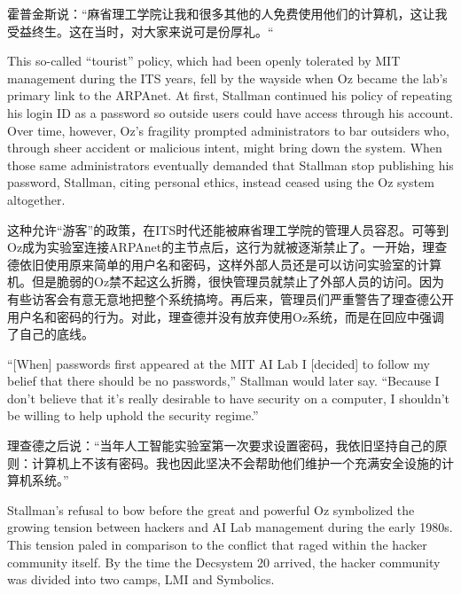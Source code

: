 \ifdefined\chs
霍普金斯说：“麻省理工学院让我和很多其他的人免费使用他们的计算机，这让我受益终生。这在当时，对大家来说可是份厚礼。“
\fi

\ifdefined\eng
This so-called ``tourist'' policy, which had been openly tolerated by MIT management during the ITS years, fell by the wayside when Oz became the lab's primary link to the ARPAnet. At first, Stallman continued his policy of repeating his login ID as a password so outside users could have access through his account. Over time, however, Oz's fragility prompted administrators to bar outsiders who, through sheer accident or malicious intent, might bring down the system. When those same administrators eventually demanded that Stallman stop publishing his password, Stallman, citing personal ethics, instead ceased using the Oz system altogether.
\fi

\ifdefined\chs
这种允许“游客”的政策，在ITS时代还能被麻省理工学院的管理人员容忍。可等到Oz成为实验室连接ARPAnet的主节点后，这行为就被逐渐禁止了。一开始，理查德依旧使用原来简单的用户名和密码，这样外部人员还是可以访问实验室的计算机。但是脆弱的Oz禁不起这么折腾，很快管理员就禁止了外部人员的访问。因为有些访客会有意无意地把整个系统搞垮。再后来，管理员们严重警告了理查德公开用户名和密码的行为。对此，理查德并没有放弃使用Oz系统，而是在回应中强调了自己的底线。
\fi

\ifdefined\eng
``[When] passwords first appeared at the MIT AI Lab I [decided] to follow my belief that there should be no passwords,'' Stallman would later say. ``Because I don't believe that it's really desirable to have security on a computer, I shouldn't be willing to help uphold the security regime.''
\fi

\ifdefined\chs
理查德之后说：“当年人工智能实验室第一次要求设置密码，我依旧坚持自己的原则：计算机上不该有密码。我也因此坚决不会帮助他们维护一个充满安全设施的计算机系统。”
\fi

\ifdefined\eng
Stallman's refusal to bow before the great and powerful Oz symbolized the growing tension between hackers and AI Lab management during the early 1980s. This tension paled in comparison to the conflict that raged within the hacker community itself. By the time the Decsystem 20 arrived, the hacker community was divided into two camps, LMI and Symbolics.
\fi

